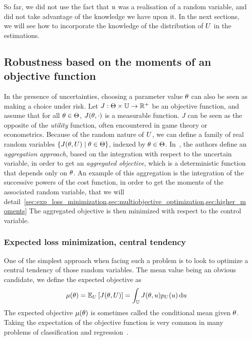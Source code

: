 \documentclass[../../Main_ManuscritThese.tex]{subfiles}
\begin{document}
So far, we did not use the fact that $u$ was a realisation of a
random variable, and did not take advantage of the knowledge we have
upon it. In the next sections, we will see how to incorporate the
knowledge of the distribution of $U$ in the estimations.

\subsection{Robustness based on the moments of an objective function}
In the presence of uncertainties, choosing a parameter value $\theta$ can
also be seen as making a choice under risk. Let
$J:\Theta \times \mathbb{U}\rightarrow \mathbb{R}^+$ be an objective
function, and assume that for all $\theta \in \Theta$, $J(\theta, \cdot)$
is a measurable function.  $J$ can be seen as the opposite of the
\emph{utility} function, often encountered in game theory or
econometrics.  Because of the random nature of $U$, we can define a
family of real random variables $\{J(\theta,U) \mid \theta \in \Theta\}$,
indexed by $\theta \in \Theta$.  In~\cite{beyer_robust_2007}, the
authors define an \emph{aggregation approach}, based on the
integration with respect to the uncertain variable, in order to get an
\emph{aggregated objective}, which is a deterministic function that
depends only on $\theta$.  An example of this aggregation is the
integration of the successive powers of the cost function, in order to
get the moments of the associated random variable, that we will
detail~\cref{sec:exp_loss_minimization,sec:multiobjective_optimization,sec:higher_moments} %
The aggregated objective is then minimized with respect to the control
variable.
\subsubsection{Expected loss minimization, central tendency}
\label{sec:exp_loss_minimization}
One of the simplest approach when facing such a problem is to look to
optimize a central tendency of those random variables. The mean value
being an obvious candidate, we define the expected objective as
\begin{equation}
  \label{eq:mean_objective}
  \mu(\theta) = \mathbb{E}_U\left[J(\theta,U)\right] =\int_{\mathbb{U}} J(\theta,u)p_U(u)\,\mathrm{d}u
\end{equation}
The expected objective $\mu(\theta)$ is sometimes called the conditional
mean given $\theta$. Taking the expectation of the objective function is
very common in many problems of classification and
regression~\cite{bishop_pattern_2006}.
\end{document}
